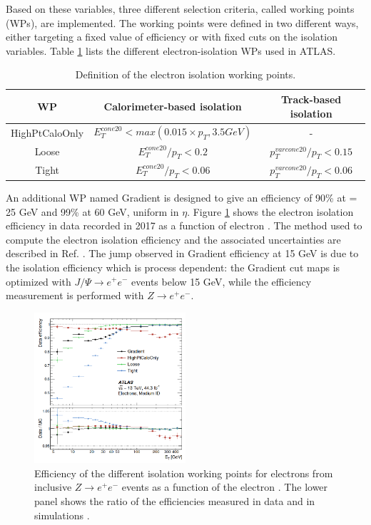Based on these variables, three different selection criteria, called working points (WPs), are implemented. The working points were defined in two different ways, either targeting a fixed value of efficiency or with fixed cuts on the isolation variables. Table \ref{tab:chap2:Objects:Egamma:EIso:WPs} lists the different electron-isolation WPs used in ATLAS.
\begin{table}[htbp]
    \centering
    \begin{tabular}{ccc}
    \hline \hline
        WP & Calorimeter-based isolation & Track-based isolation \\ \hline 
        HighPtCaloOnly & $E^{cone20}_T < max(0.015\times p_T, 3.5 GeV)$ & - \\
        Loose & $E^{cone20}_T/p_T < 0.2$ & $p^{varcone20}_T/p_T < 0.15$ \\
        Tight & $E^{cone20}_T/p_T < 0.06$ & $p^{varcone20}_T/p_T < 0.06$ \\ \hline \hline
    \end{tabular}
    \caption{Definition of the electron isolation working points.}
    \label{tab:chap2:Objects:Egamma:EIso:WPs}
\end{table}
An additional WP named Gradient is designed to give an efficiency of 90\% at \pT = 25 GeV and 99\% at 60 GeV, uniform in $\eta$. Figure \ref{fig:chap2:Objects:Egamma:EIso:Eff} shows the electron isolation efficiency in data recorded in 2017 as a function of electron \eT \cite{Egamma_Perf_2017}. The method used to compute the electron isolation efficiency and the associated uncertainties are described in Ref. \cite{Electron_Reco_Id_Run1}. The jump observed in Gradient efficiency at 15 GeV is due to the isolation efficiency which is process dependent: the Gradient cut maps is optimized with $J/\Psi\rightarrow e^+e^-$ events below 15 GeV, while the efficiency measurement is performed with $Z\rightarrow e^+e^-$.
\begin{figure}[htbp]
    \centering
    \includegraphics[width=0.5\textwidth]{Ch2/Img/Electron_Iso_Eff.png}
    \caption{Efficiency of the different isolation working points for electrons from inclusive $Z\rightarrow e^+e^-$ events as a function of the electron \eT. The lower panel shows the ratio of the efficiencies measured in data and in simulations \cite{Egamma_Perf_2017}.}
    \label{fig:chap2:Objects:Egamma:EIso:Eff}
\end{figure}

